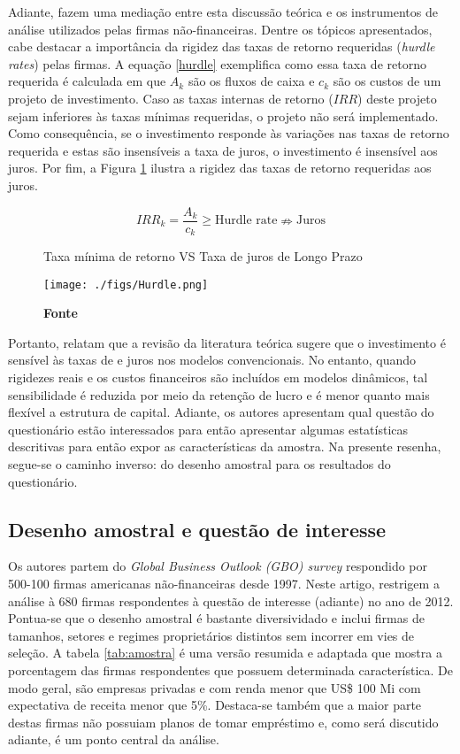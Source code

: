 \documentclass[11pt]{article}
\begin{document}
Adiante, fazem uma mediação entre esta discussão teórica e os instrumentos de análise utilizados pelas firmas não-financeiras.
Dentre os tópicos apresentados, cabe destacar a importância da rigidez das taxas de retorno requeridas (\emph{hurdle rates}) pelas firmas.
A equação \ref{hurdle} exemplifica como essa taxa de retorno requerida é calculada em que \(A_{k}\) são os fluxos de caixa e \(c_{k}\) são os custos de um projeto de investimento.
Caso as taxas internas de retorno (\(IRR\)) deste projeto sejam inferiores às taxas mínimas requeridas, o projeto não será implementado.
Como consequência, se o investimento responde às variações nas taxas de retorno requerida e estas são insensíveis a taxa de juros, o investimento é insensível aos juros.
Por fim, a Figura \ref{fig:hurdle} ilustra a rigidez das taxas de retorno requeridas aos juros.


\begin{equation}
\label{hurdle}
IRR_{k} = \frac{A_{k}}{c_{k}} \geq \text{Hurdle rate} \nRightarrow \text{Juros}
\end{equation}

\begin{figure}[htb]
\centering
\caption{Taxa mínima de retorno VS Taxa de juros de Longo Prazo}
\texttt{[image: ./figs/Hurdle.png]}
\label{fig:hurdle}
\caption*{\textbf{Fonte} \textcite[p.~6]{sharpe_2020_Why}}
\end{figure}

Portanto, \textcite{sharpe_2020_Why} relatam que a revisão da literatura teórica sugere que o investimento é sensível às taxas de e juros nos modelos convencionais.
No entanto, quando rigidezes reais e os custos financeiros são incluídos em modelos dinâmicos, tal sensibilidade é reduzida por meio da retenção de lucro e é menor quanto mais flexível a estrutura de capital.
Adiante, os autores apresentam qual questão do questionário estão interessados para então apresentar algumas estatísticas descritivas para então expor as características da amostra.
Na presente resenha, segue-se o caminho inverso: do desenho amostral para os resultados do questionário.

\subsection*{Desenho amostral e questão de interesse}
\label{sec:orgf953594}

Os autores partem do \emph{Global Business Outlook (GBO) survey} respondido por 500-100 firmas americanas não-financeiras desde 1997.
Neste artigo, restrigem a análise à 680 firmas respondentes à questão de interesse (adiante) no ano de 2012.
Pontua-se que o desenho amostral é bastante diversividado e inclui firmas de tamanhos, setores e regimes proprietários distintos sem incorrer em vies de seleção.
A tabela \ref{tab:amostra} é uma versão resumida e adaptada que mostra a porcentagem das firmas respondentes que possuem determinada característica.
De modo geral, são empresas privadas e com renda menor que US\$ 100 Mi com expectativa de receita menor que 5\%.
Destaca-se também que a maior parte destas firmas não possuiam planos de tomar empréstimo e, como será discutido adiante, é um ponto central da análise.
\end{document}
